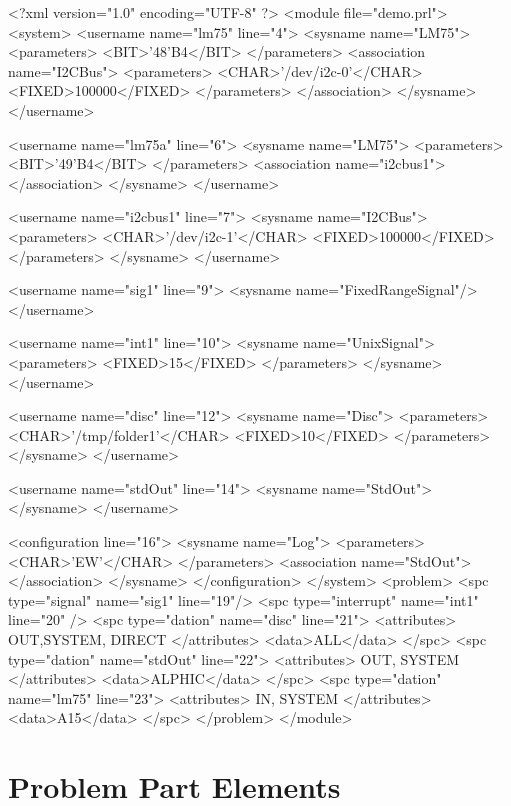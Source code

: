 \begin{XMLCode}
<?xml version="1.0" encoding="UTF-8" ?>
<module file="demo.prl">
<system>
   <username name="lm75" line="4">
      <sysname name="LM75">
      <parameters>
         <BIT>'48'B4</BIT>
      </parameters>
      <association name="I2CBus">
         <parameters>
            <CHAR>'/dev/i2c-0'</CHAR>
            <FIXED>100000</FIXED>
         </parameters>
      </association>
   </sysname>
</username>

<username name="lm75a" line="6">
   <sysname name="LM75">
      <parameters>
         <BIT>'49'B4</BIT>
      </parameters>
      <association name="i2cbus1">
      </association>
   </sysname>
</username>

<username name="i2cbus1" line="7">
   <sysname name="I2CBus">
      <parameters>
         <CHAR>'/dev/i2c-1'</CHAR>
         <FIXED>100000</FIXED>
      </parameters>
   </sysname>
</username>

<username name="sig1" line="9">
   <sysname name="FixedRangeSignal"/>
</username>

<username name="int1" line="10">
   <sysname name="UnixSignal">
      <parameters>
         <FIXED>15</FIXED>
      </parameters>
   </sysname>
</username>

<username name="disc" line="12">
   <sysname name="Disc">
      <parameters>
         <CHAR>'/tmp/folder1'</CHAR>
         <FIXED>10</FIXED>
      </parameters>
   </sysname>
</username>

<username name="stdOut" line="14">
   <sysname name="StdOut">
   </sysname>
</username> 

<configuration line="16">
   <sysname name="Log">
      <parameters>
         <CHAR>'EW'</CHAR>
      </parameters>
      <association name="StdOut">
      </association>
   </sysname>
</configuration>
</system>
<problem>
<spc type="signal" name="sig1" line="19"/>
<spc type="interrupt" name="int1" line="20" />
<spc type="dation" name="disc" line="21">
   <attributes> OUT,SYSTEM, DIRECT </attributes>
   <data>ALL</data>
</spc>
<spc type="dation" name="stdOut" line="22">
      <attributes> OUT, SYSTEM </attributes>
      <data>ALPHIC</data>
</spc>
<spc type="dation" name="lm75" line="23">
      <attributes> IN, SYSTEM </attributes>
      <data>A15</data>
</spc>
</problem>
</module>
\end{XMLCode}
\section{Problem Part Elements}
